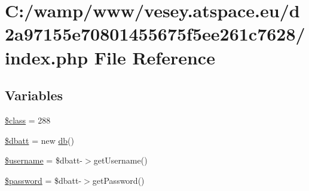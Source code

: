 \hypertarget{d2a97155e70801455675f5ee261c7628_2index_8php}{\section{C\-:/wamp/www/vesey.atspace.\-eu/d2a97155e70801455675f5ee261c7628/index.php File Reference}
\label{d2a97155e70801455675f5ee261c7628_2index_8php}
}
\subsection*{Variables}
\begin{DoxyCompactItemize}
\item 
\hyperlink{d2a97155e70801455675f5ee261c7628_2index_8php_a252ba022809910ea710a068fc1bab657}{\$class} = 288
\item 
\hyperlink{d2a97155e70801455675f5ee261c7628_2index_8php_a91a28d35770d3a47412dce6c8059f374}{\$dbatt} = new \hyperlink{classdb}{db}()
\item 
\hyperlink{d2a97155e70801455675f5ee261c7628_2index_8php_a0eb82aa5f81cf845de4b36cd653c42cf}{\$username} = \$dbatt-\/$>$get\-Username()
\item 
\hyperlink{d2a97155e70801455675f5ee261c7628_2index_8php_a607686ef9f99ea7c42f4f3dd3dbb2b0d}{\$password} = \$dbatt-\/$>$get\-Password()
\end{DoxyCompactItemize}


